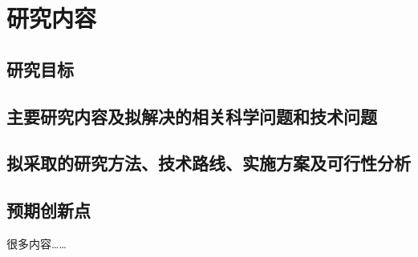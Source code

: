 \section{研究内容}\label{sec:researchContent}

\subsection{研究目标}

\subsection{主要研究内容及拟解决的相关科学问题和技术问题}
	
\subsection{拟采取的研究方法、技术路线、实施方案及可行性分析}

\subsection{预期创新点}

很多内容……
